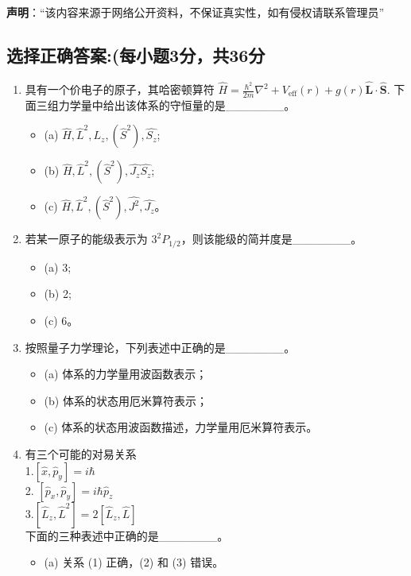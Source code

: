 
\textbf{声明}：“该内容来源于网络公开资料，不保证真实性，如有侵权请联系管理员”

\subsection{选择正确答案:(每小题3分，共36分}
\begin{enumerate}
\item  具有一个价电子的原子，其哈密顿算符 $\hat{H} = \frac{\hbar^2}{2m} \nabla^2 + V_{\text{eff}}(r) + g(r) \mathbf{\hat L} \cdot \mathbf{\hat S}$. 下面三组力学量中给出该体系的守恒量的是_______。
    \begin{itemize}
        \item (a) $\hat{H}, \hat{L}^2, L_z, (\hat{S}^2), \hat{S_z}$;
        \item (b) $\hat{H}, \hat{L}^2, (\hat{S}^2), \hat{J_z}\hat{S_z}$;
        \item (c) $\hat{H}, \hat{L}^2, (\hat{S}^2), \hat{J^2},\hat{J_z}$。
    \end{itemize}
\item  若某一原子的能级表示为 $3^2P_{1/2}$，则该能级的简并度是_______。
 \begin{itemize}
        \item (a) 3;
        \item (b) 2;
        \item (c) 6。
    \end{itemize}
    \item 按照量子力学理论，下列表述中正确的是_______。
    \begin{itemize}
        \item (a) 体系的力学量用波函数表示；
        \item (b) 体系的状态用厄米算符表示；
        \item (c) 体系的状态用波函数描述，力学量用厄米算符表示。
    \end{itemize}
     \item 有三个可能的对易关系\\
     1.$[\hat{x}, \hat{p}_y] = i \hbar$\\
     2. $[\hat{p}_x, \hat{p}_y] = i \hbar \hat{p}_z$\\
     3.$[\hat{L}_z, \hat{L}^2] = 2[\hat{L}_z, \hat{L}]$\\
     下面的三种表述中正确的是_______。
     \begin{itemize}
        \item (a) 关系 (1) 正确，(2) 和 (3) 错误。

\end{itemize}
\end{enumerate}
